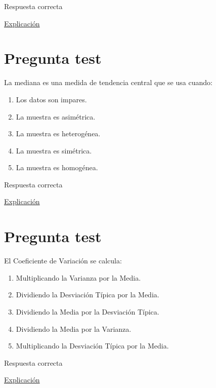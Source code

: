 \documentclass[
]{book}
\providecommand{\tightlist}{%
  \setlength{\itemsep}{0pt}\setlength{\parskip}{0pt}}
\begin{document}
Respuesta correcta

\href{https://1fjmanzano.github.io/bioestadistica/otros-gra\%CC\%81ficos.html}{Explicación}

\hypertarget{pregunta-test-53}{%
\section{Pregunta test}\label{pregunta-test-53}}

La mediana es una medida de tendencia central que se usa cuando:

\begin{enumerate}
\def\labelenumi{\alph{enumi})}
\tightlist
\item
  Los datos son impares.
\item
  La muestra es asimétrica.
\item
  La muestra es heterogénea.
\item
  La muestra es simétrica.
\item
  La muestra es homogénea.
\end{enumerate}

Respuesta correcta

\href{https://1fjmanzano.github.io/bioestadistica/medidas-de-posicio\%CC\%81n-dispersio\%CC\%81n-y-forma.html\#medidas-de-posicio\%CC\%81n-centrales}{Explicación}

\hypertarget{pregunta-test-54}{%
\section{Pregunta test}\label{pregunta-test-54}}

El Coeficiente de Variación se calcula:

\begin{enumerate}
\def\labelenumi{\alph{enumi})}
\tightlist
\item
  Multiplicando la Varianza por la Media.
\item
  Dividiendo la Desviación Típica por la Media.
\item
  Dividiendo la Media por la Desviación Típica.
\item
  Dividiendo la Media por la Varianza.
\item
  Multiplicando la Desviación Típica por la Media.
\end{enumerate}

Respuesta correcta

\href{https://es.wikipedia.org/wiki/Coeficiente_de_variación}{Explicación}
\end{document}
